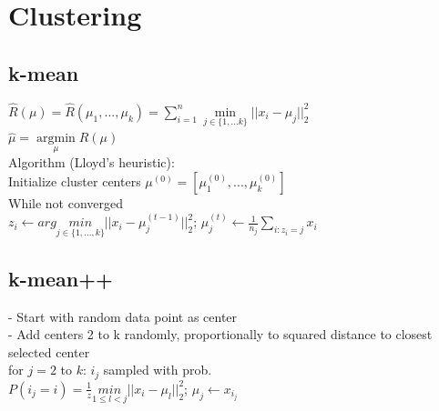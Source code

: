 \section*{Clustering}
\subsection*{k-mean}

$\hat{R}(\mu) = \hat{R}(\mu_1,...,\mu_k) = \sum_{i=1}^n \underset{j\in\{1,...k\}}{\operatorname{min}}||x_i-\mu_j||_2^2$\\
$\hat{\mu} =  \underset{\mu}{\operatorname{argmin}} \hat{R}(\mu)$\\
Algorithm (Lloyd's heuristic):\\
Initialize cluster centers $\mu^{(0)} = [\mu_1^{(0)},...,\mu_k^{(0)}]$\\
While not converged\\
$z_i \leftarrow arg \underset{j\in\{1,...,k\}}{min}||x_i - \mu_j^{(t-1)}||_2^2$; $\mu_j^{(t)} \leftarrow \frac{1}{n_j}\sum_{i:z_i=j}x_i$

\subsection*{k-mean++}
- Start with random data point as center\\
- Add centers 2 to k randomly, proportionally to squared distance to closest selected center\\
for $j=2$ to $k$:
$i_j$ sampled with prob.\\
$P(i_j=i) = \frac{1}{z} \underset{1\leq l<j}{min}||x_i-\mu_l||_2^2$; $\mu_j \leftarrow x_{i_j}$